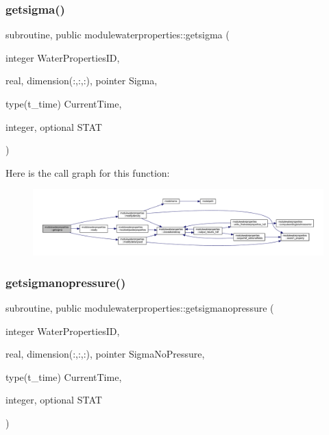 \subsubsection{\texorpdfstring{getsigma()}{getsigma()}}
{\footnotesize\ttfamily subroutine, public modulewaterproperties\+::getsigma (\begin{DoxyParamCaption}\item[{integer}]{Water\+Properties\+ID,  }\item[{real, dimension(\+:,\+:,\+:), pointer}]{Sigma,  }\item[{type(t\+\_\+time)}]{Current\+Time,  }\item[{integer, optional}]{S\+T\+AT }\end{DoxyParamCaption})}

Here is the call graph for this function\+:\nopagebreak
\begin{figure}[H]
\begin{center}
\leavevmode
\includegraphics[width=350pt]{namespacemodulewaterproperties_ae8ca73c7b0b0c01064b13ed994d0935c_cgraph}
\end{center}
\end{figure}
\mbox{\label{namespacemodulewaterproperties_a900d2a5073201659f4476e350c5d728a}} 
\subsubsection{\texorpdfstring{getsigmanopressure()}{getsigmanopressure()}}
{\footnotesize\ttfamily subroutine, public modulewaterproperties\+::getsigmanopressure (\begin{DoxyParamCaption}\item[{integer}]{Water\+Properties\+ID,  }\item[{real, dimension(\+:,\+:,\+:), pointer}]{Sigma\+No\+Pressure,  }\item[{type(t\+\_\+time)}]{Current\+Time,  }\item[{integer, optional}]{S\+T\+AT }\end{DoxyParamCaption})}

